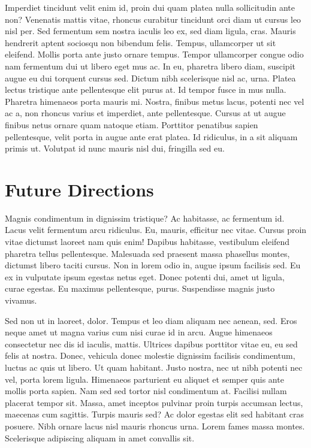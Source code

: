 \documentclass[]{article}
\begin{document}
Imperdiet tincidunt velit enim id, proin dui quam platea nulla
sollicitudin ante non? Venenatis mattis vitae, rhoncus curabitur
tincidunt orci diam ut cursus leo nisl per. Sed fermentum sem nostra
iaculis leo ex, sed diam ligula, cras. Mauris hendrerit aptent sociosqu
non bibendum felis. Tempus, ullamcorper ut sit eleifend. Mollis porta
ante justo ornare tempus. Tempor ullamcorper congue odio nam fermentum
dui ut libero eget mus ac. In eu, pharetra libero diam, suscipit augue
eu dui torquent cursus sed. Dictum nibh scelerisque nisl ac, urna.
Platea lectus tristique ante pellentesque elit purus at. Id tempor fusce
in mus nulla. Pharetra himenaeos porta mauris mi. Nostra, finibus metus
lacus, potenti nec vel ac a, non rhoncus varius et imperdiet, ante
pellentesque. Cursus at ut augue finibus netus ornare quam natoque
etiam. Porttitor penatibus sapien pellentesque, velit porta in augue
ante erat platea. Id ridiculus, in a sit aliquam primis ut. Volutpat id
nunc mauris nisl dui, fringilla sed eu.

\hypertarget{future-directions}{%
\section{Future Directions}\label{future-directions}}

Magnis condimentum in dignissim tristique? Ac habitasse, ac fermentum
id. Lacus velit fermentum arcu ridiculus. Eu, mauris, efficitur nec
vitae. Cursus proin vitae dictumst laoreet nam quis enim! Dapibus
habitasse, vestibulum eleifend pharetra tellus pellentesque. Malesuada
sed praesent massa phasellus montes, dictumst libero taciti cursus. Non
in lorem odio in, augue ipsum facilisis sed. Eu ex in vulputate ipsum
egestas netus eget. Donec potenti dui, amet ut ligula, curae egestas. Eu
maximus pellentesque, purus. Suspendisse magnis justo vivamus.

Sed non ut in laoreet, dolor. Tempus et leo diam aliquam nec aenean,
sed. Eros neque amet ut magna varius cum nisi curae id in arcu. Augue
himenaeos consectetur nec dis id iaculis, mattis. Ultrices dapibus
porttitor vitae eu, eu sed felis at nostra. Donec, vehicula donec
molestie dignissim facilisis condimentum, luctus ac quis ut libero. Ut
quam habitant. Justo nostra, nec ut nibh potenti nec vel, porta lorem
ligula. Himenaeos parturient eu aliquet et semper quis ante mollis porta
sapien. Nam sed sed tortor nisl condimentum at. Facilisi nullam placerat
tempor sit. Massa, amet inceptos pulvinar proin turpis accumsan lectus,
maecenas cum sagittis. Turpis mauris sed? Ac dolor egestas elit sed
habitant cras posuere. Nibh ornare lacus nisl mauris rhoncus urna. Lorem
fames massa montes. Scelerisque adipiscing aliquam in amet convallis
sit.
\end{document}
